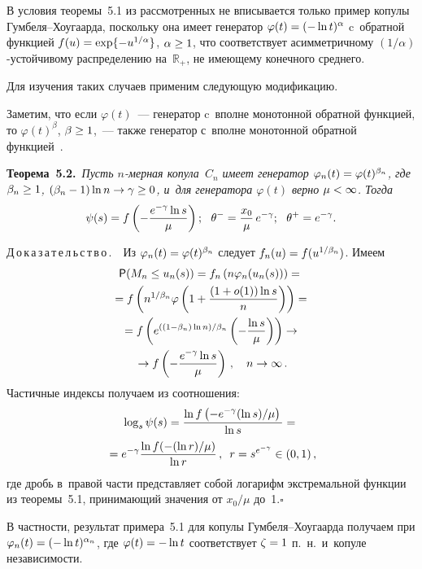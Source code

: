 \begin{multicols}{2}
В условия теоремы~5.1 из рассмотренных не вписывается
только пример копулы Гум\-бе\-ля--Хоу\-га\-ар\-да,
поскольку она имеет генератор $\varphi(t)\hm=(-\ln t)^\alpha$
c~обратной функцией $f(u)\hm=\exp\{-u^{1/\alpha}\}$, $\alpha\hm\ge 1$,
что соответствует асимметричному $(1/\alpha)$-устой\-чи\-во\-му
распределению на~${\mathbb{R}}_+$, не имеющему конечного среднего.

Для изучения таких случаев применим сле\-ду\-ющую модификацию.

Заметим, что если $\varphi(t)$~--- генератор c~вполне монотонной обратной функцией,
то $\varphi(t)^\beta$, $\beta\hm\ge 1$,~--- также генератор  с~вполне
монотонной обратной функцией~\cite[лемма 4.6.4]{Nel}.

\smallskip

\noindent
\textbf{Теорема~5.2.}\ \textit{Пусть $n$-мер\-ная копула~$C_n$ имеет
генератор $\varphi_n(t)\hm=\varphi(t)^{\beta_n}$,
где $\beta_n\hm\ge 1$, $(\beta_n-1)\ln n\hm\to\gamma\hm\ge 0$,
и~для генератора $\varphi(t)$ верно $\mu\hm<\infty$.
Тогда }
$$
\psi(s)=f\left(-\fr{e^{-\gamma}\ln s}{\mu}\right);\ \ 
\theta^-=\fr{x_0}{\mu}\,e^{-\gamma};\ \ \theta^+=e^{-\gamma}.
$$

\noindent
Д\,о\,к\,а\,з\,а\,т\,е\,л\,ь\,с\,т\,в\,о\,.\ \
Из $\varphi_n(t)\hm=\varphi(t)^{\beta_n}$ следует $f_n(u)\hm=f(u^{1/\beta_n})$. Имеем
\begin{multline*}
{\sf P}(M_n\le u_n(s))=f_n\left(n\varphi_n(u_n(s))\right)={}\\
{}=
f\left(n^{1/\beta_n}\varphi\left(1+\displaystyle\frac{\displaystyle (1+o(1))\ln s\mathstrut}{\displaystyle n\mathstrut}\right)\right)={}\\
{}=f\left(e^{((1-\beta_n)\ln n)/\beta_n}\left(-\displaystyle\frac{\displaystyle \ln s\mathstrut}{\displaystyle \mu\mathstrut}\right)\right)\to{}\\
{}\to
f\left(-\displaystyle\frac{\displaystyle e^{-\gamma}\ln s\mathstrut}{\displaystyle \mu\mathstrut}\right)\,,\quad n\to\infty\,.
\end{multline*}
Частичные индексы получаем из соотношения:
\begin{multline*}
\log_s\psi(s)=\displaystyle\frac{\displaystyle \ln f\left(-e^{-\gamma}(\ln s)/\mu\right)\mathstrut}{\displaystyle \ln s\mathstrut}={}\\
{}=
e^{-\gamma}\displaystyle\frac{\displaystyle \ln f(-(\ln r)/\mu)\mathstrut}{\displaystyle \ln r\mathstrut}\,,
\enskip r=s^{e^{-\gamma}}\in (0,1)\,,
\end{multline*}
где дробь в~правой части представляет собой логарифм экстремальной
функции из теоремы~5.1, принимающий значения от $x_0/\mu$ до~1.\hfill$\square$

\smallskip

В частности, результат примера~5.1 для копулы Гум\-бе\-ля--Хоу\-га\-ар\-да
получаем при $\varphi_n(t)\hm=(-\ln t)^{\alpha_n}$, где
$\varphi(t)\hm=-\ln t$ соответствует $\zeta\hm=1$ п.~н.\ и~копуле
независимости.


\end{multicols}
